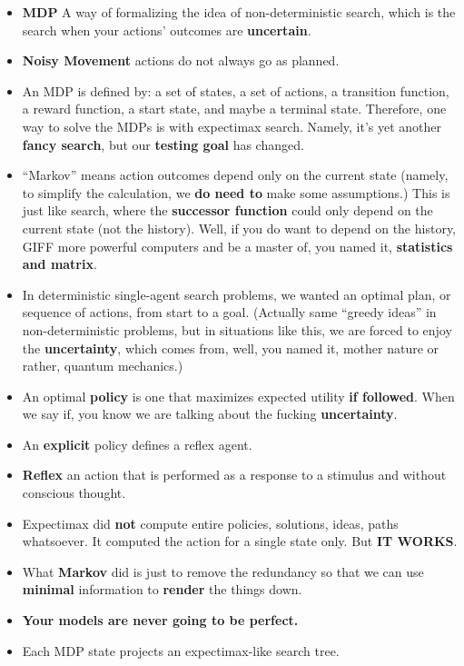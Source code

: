 \documentclass[twocolumn]{article}
\begin{document}
\begin{itemize}
\item \textbf{MDP} A way of formalizing the idea of non-deterministic
  search, which is the search when your actions' outcomes are
  \textbf{uncertain}. 
\item \textbf{Noisy Movement} actions do not always go as planned.
\item An MDP is defined by: a set of states, a set of actions, a
  transition function, a reward function, a start state, and maybe a
  terminal state. Therefore, one way to solve the MDPs is with
  expectimax search. Namely, it's yet another \textbf{fancy search},
  but our \textbf{testing goal} has changed.
\item ``Markov'' means action outcomes depend only on the current
  state (namely, to simplify the calculation, we \textbf{do need to}
  make some assumptions.) This is just like search, where the
  \textbf{successor function} could only depend on the current state
  (not the history). Well, if you do want to depend on the history,
  GIFF more powerful computers and be a master of, you named it,
  \textbf{statistics and matrix}.
\item In deterministic single-agent search problems, we wanted an
  optimal plan, or sequence of actions, from start to a
  goal. (Actually same ``greedy ideas'' in non-deterministic problems,
  but in situations like this, we are forced to enjoy the
  \textbf{uncertainty}, which comes from, well, you named it, mother
  nature or rather, quantum mechanics.)
\item An optimal \textbf{policy} is one that maximizes expected
  utility \textbf{if followed}. When we say if, you know we are
  talking about the fucking \textbf{uncertainty}.
\item An \textbf{explicit} policy defines a reflex agent. 
\item \textbf{Reflex} an action that is performed as a response to a
  stimulus and without conscious thought. 
\item Expectimax did \textbf{not} compute entire policies, solutions,
  ideas, paths whatsoever. It computed the action for a single state
  only. But \textbf{IT WORKS}.
\item What \textbf{Markov} did is just to remove the redundancy so
  that we can use \textbf{minimal} information to \textbf{render} the
  things down.
\item \textbf{Your models are never going to be perfect.}
\item Each MDP state projects an expectimax-like search tree.

\end{itemize}
\end{document}
